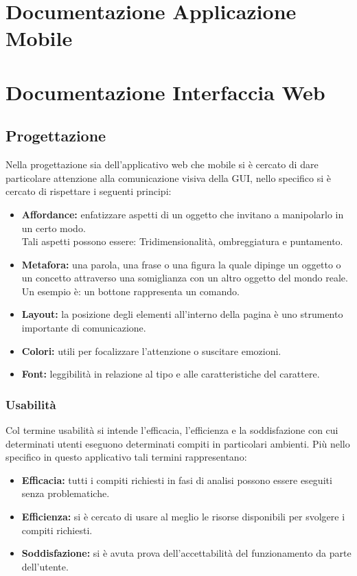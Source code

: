 \documentclass[a4paper,final,12pt]{report}
\begin{document}
\chapter{Documentazione Applicazione Mobile}

\chapter{Documentazione Interfaccia Web}

\section{Progettazione}
Nella progettazione sia dell'applicativo web che mobile si è cercato di dare particolare attenzione alla comunicazione visiva della GUI, nello specifico si è cercato di rispettare i seguenti principi:
\begin{itemize}
\item \textbf{Affordance:} enfatizzare aspetti di un oggetto che invitano a manipolarlo in un certo modo.\\ Tali aspetti possono essere: Tridimensionalità, ombreggiatura e puntamento.
\item \textbf{Metafora:} una parola, una frase o una figura la quale dipinge un oggetto o un concetto attraverso una somiglianza con un altro oggetto del mondo reale. Un esempio è: un bottone rappresenta un comando.
\item \textbf{Layout:} 
la posizione degli elementi all'interno della pagina è uno strumento importante di comunicazione.
\item \textbf{Colori:} utili per focalizzare l'attenzione o suscitare emozioni.
\item \textbf{Font:} leggibilità in relazione al tipo e alle caratteristiche del carattere.
\end{itemize}

\subsection{Usabilità}
Col termine usabilità si intende l'efficacia, l'efficienza e la soddisfazione con cui determinati utenti eseguono determinati compiti in particolari ambienti. 
Più nello specifico in questo applicativo tali termini rappresentano:
\begin{itemize}
\item \textbf{Efficacia:} tutti i compiti richiesti in fasi di analisi possono essere eseguiti senza problematiche.
\item \textbf{Efficienza:} si è cercato di usare al meglio le risorse disponibili per svolgere i compiti richiesti.
\item \textbf{Soddisfazione:} si è avuta prova dell'accettabilità del funzionamento da parte dell'utente.
\end{itemize}
\end{document}
